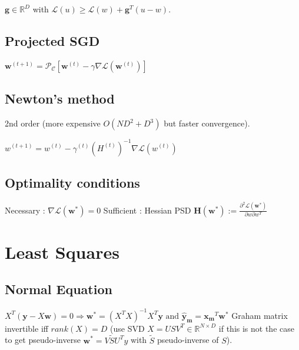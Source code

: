 $\mathbf{g} \in \mathbb{R}^D$ with $\mathcal{L}(u) \ge \mathcal{L}(w) + \mathbf{g}^T (u-w)$. 


\subsection{Projected SGD}

$\mathbf{w}^{(t+1)} = \mathcal{P_C} [\mathbf{w}^{(t)} - \gamma \nabla \mathcal{L}(\mathbf{w}^{(t)})]$

\subsection{Newton's method}
2nd order (more expensive \newline $O(ND^2 + D^3)$ but faster convergence).

$w^{(t+1)} = w^{(t)} - \gamma^{(t)} (H^{(t)})^{-1} \nabla \mathcal{L}(w^{(t)})$

\subsection{Optimality conditions}
Necessary : $\nabla \mathcal{L} (\mathbf{w}^*) = 0$
Sufficient : Hessian PSD $\mathbf{H}(\mathbf{w}^*) := \frac{\partial^2 \mathcal{L}(\mathbf{w}^*)}{\partial w \partial w^T}$
\newline

\section{Least Squares}
\subsection{Normal Equation}
$X^T (\mathbf{y} - X\mathbf{w})= 0 \Rightarrow$\newline$\mathbf{w^*} = (X^TX)^{-1}X^T\mathbf{y} \text{ and } \mathbf{\hat{y}_m} = \mathbf{x_m}^T \mathbf{w^*}$
Graham matrix invertible iff $rank(X) = D$ (use SVD $X = USV^T \in \mathbb{R}^{N\times D}$ if this is not the case to get pseudo-inverse $\mathbf{w^*} = V\tilde{S}U^Ty$ with $\tilde{S}$ pseudo-inverse of $S$).

